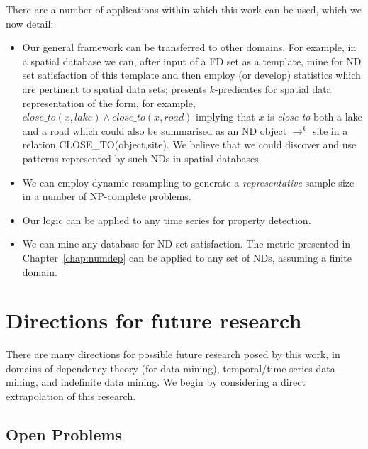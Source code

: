 There are a number of applications within which this work can be
used, which we now detail:
\begin{itemize}
\item Our general framework can be transferred to other domains. For
example, in a spatial database we can, after input of a FD set as a
template, mine for ND set satisfaction of this template and
then employ (or develop) statistics which are pertinent to spatial
data sets; \cite{kah96} presents $k$-predicates for spatial data
representation of the form, for example, $close\_to(x,lake) \wedge
close\_to(x,road)$ implying that $x$ is {\em close to} both a lake and a
road which could also be summarised as an ND object $\to^k$ site in a
relation CLOSE\_TO(object,site).  We believe that we could discover
and use patterns represented
by such NDs in spatial databases.
\item We can employ dynamic resampling to generate a {\em
representative} sample size in a number of NP-complete problems. 
\item Our logic can be applied to any time series for property
detection. 
\item We can mine any database for ND set satisfaction. The metric
presented in Chapter~\ref{chap:numdep} can be applied to any set of
NDs, assuming a finite domain.
\end{itemize}

\section{Directions for future research}

There are many directions for possible future research posed by this
work, in domains of dependency theory (for data mining), temporal/time
series data mining, and indefinite data mining. We begin by
considering a direct extrapolation of this research.
 
\subsection{Open Problems}

